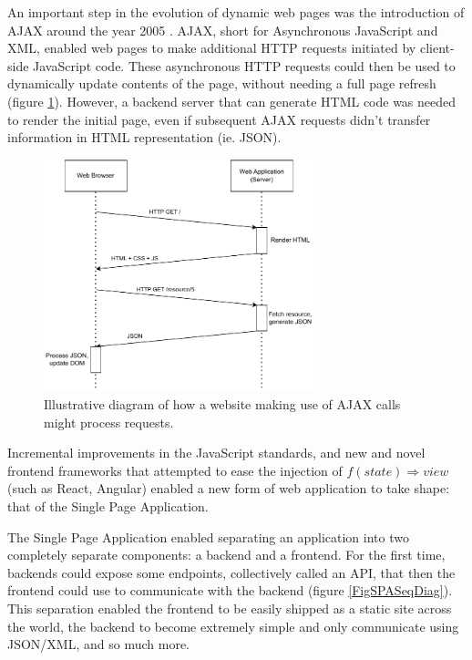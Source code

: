 An important step in the evolution of dynamic web pages was the introduction of AJAX around the year 2005 \cite{PWAShortHist}. AJAX, short for Asynchronous JavaScript and XML, enabled web pages to make additional HTTP requests initiated by client-side JavaScript code. These asynchronous HTTP requests could then be used to dynamically update contents of the page, without needing a full page refresh (figure \ref{FigAJAXSeqDiag}). However, a backend server that can generate HTML code was needed to render the initial page, even if subsequent AJAX requests didn't transfer information in HTML representation (ie. JSON).

\begin{figure}[htbp]
    \centering
    \includegraphics[width=0.7\textwidth]{./figures/ch2_ajax-seq-diag.pdf}
    \caption{Illustrative diagram of how a website making use of AJAX calls might process requests.}
    \label{FigAJAXSeqDiag}
\end{figure}

Incremental improvements in the JavaScript standards, and new and novel frontend frameworks that attempted to ease the injection of \( f(state) \Rightarrow view \) (such as React, Angular) enabled a new form of web application to take shape: that of the Single Page Application.

The Single Page Application enabled separating an application into two completely separate components: a backend and a frontend. For the first time, backends could expose some endpoints, collectively called an API, that then the frontend could use to communicate with the backend (figure \ref{FigSPASeqDiag}). This separation enabled the frontend to be easily shipped as a static site across the world, the backend to become extremely simple and only communicate using JSON/XML, and so much more.

